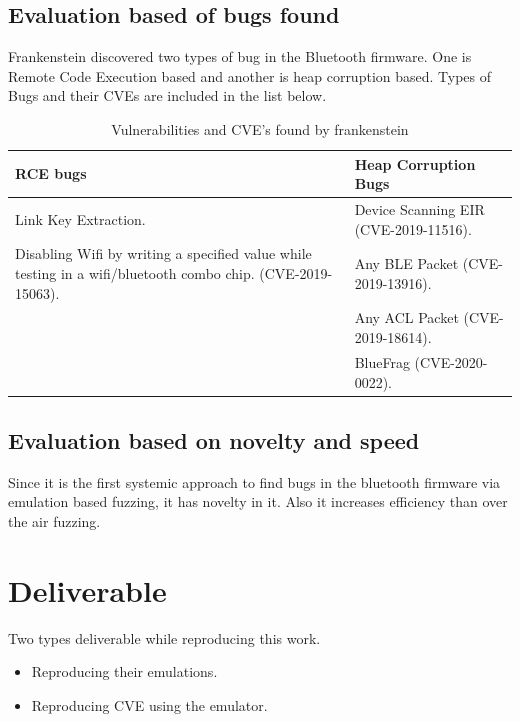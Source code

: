 \documentclass[letterpaper,11pt]{article}
\begin{document}
\subsection{Evaluation based of bugs found} 
Frankenstein discovered two types of bug in the Bluetooth firmware. One is Remote Code Execution based and another is heap corruption based. Types of Bugs and their CVEs are included in the list below. 
\begin{table}[h]
    \centering
    \begin{tabular}{|p{65mm}|p{65mm}|}
    \hline
    RCE bugs & Heap Corruption Bugs \\
    \hline
     Link Key Extraction. &  Device Scanning EIR (CVE-2019-11516).  \\
     \hline
    Disabling Wifi by writing a specified value while testing in a wifi/bluetooth combo chip. (CVE-2019-15063). &  Any BLE Packet (CVE-2019-13916). \\
    \hline
     &  Any ACL Packet (CVE-2019-18614). \\
    \hline
     &  BlueFrag (CVE-2020-0022).\\
    \hline
    \end{tabular}
    \caption{Vulnerabilities and CVE's found by frankenstein}
    \label{tab:lseek()_table}
\end{table}
\subsection{Evaluation based on novelty and speed} 
Since it is the first systemic approach to find bugs in the bluetooth firmware via emulation based fuzzing, it has novelty in it. Also it increases efficiency than over the air fuzzing.

\section{Deliverable}
\label{sec:deliverable}
Two types deliverable while reproducing this work. 
\begin{itemize}
    \item Reproducing their emulations.
    \item Reproducing CVE using the emulator.
\end{itemize}
\end{document}
